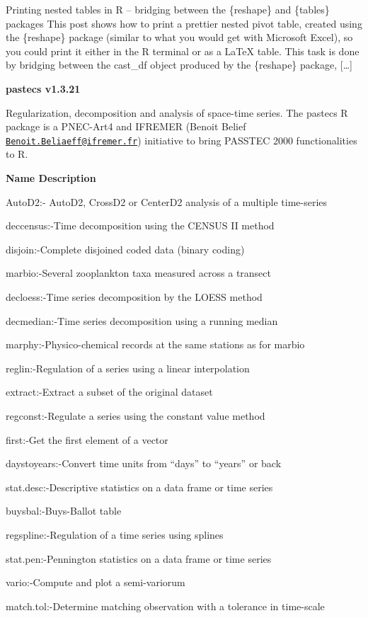 \documentclass[12pt,openany]{book}
\begin{document}
Printing nested tables in R -- bridging between the \{reshape\} and \{tables\} packages
This post shows how to print a prettier nested pivot table, created using the \{reshape\} package (similar to what you would get with Microsoft Excel), so you could print it either in the R terminal or as a LaTeX table. This task is done by bridging between the cast\_df object produced by the \{reshape\} package, {[}\ldots{}{]}

\textbf{pastecs v1.3.21}

Regularization, decomposition and analysis of space-time series. The pastecs R package is a PNEC-Art4 and IFREMER (Benoit Belief \href{mailto:Benoit.Beliaeff@ifremer.fr}{\nolinkurl{Benoit.Beliaeff@ifremer.fr}}) initiative to bring PASSTEC 2000 functionalities to R.

\textbf{Name Description}

AutoD2:- AutoD2, CrossD2 or CenterD2 analysis of a multiple time-series

deccensus:-Time decomposition using the CENSUS II method

disjoin:-Complete disjoined coded data (binary coding)

marbio:-Several zooplankton taxa measured across a transect

decloess:-Time series decomposition by the LOESS method

decmedian:-Time series decomposition using a running median

marphy:-Physico-chemical records at the same stations as for marbio

reglin:-Regulation of a series using a linear interpolation

extract:-Extract a subset of the original dataset

regconst:-Regulate a series using the constant value method

first:-Get the first element of a vector

daystoyears:-Convert time units from ``days'' to ``years'' or back

stat.desc:-Descriptive statistics on a data frame or time series

buysbal:-Buys-Ballot table

regspline:-Regulation of a time series using splines

stat.pen:-Pennington statistics on a data frame or time series

vario:-Compute and plot a semi-variorum

match.tol:-Determine matching observation with a tolerance in time-scale
\end{document}
